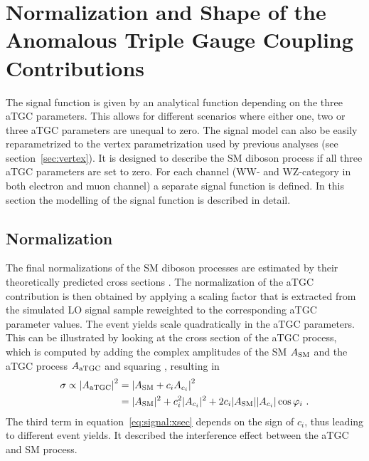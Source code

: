 \section{Normalization and Shape of the Anomalous Triple Gauge Coupling Contributions}
\label{sec:NormalizationandShapeoftheaTGCContributions}

The signal function is given by an analytical function depending on the three aTGC parameters. This allows for different scenarios where either one, two or three aTGC parameters are unequal to zero. The signal model can also be easily reparametrized to the vertex parametrization used by previous analyses (see section~\ref{sec:vertex}). It is designed to describe the SM diboson process if all three aTGC parameters are set to zero. For each channel (WW- and WZ-category in both electron and muon channel) a separate signal function is defined. In this section the modelling of the signal function is described in detail.

\subsection*{Normalization}
The final normalizations of the SM diboson processes are estimated by their theoretically predicted cross sections \cite{WWxsec,WZxsec}. The normalization of the aTGC contribution is then obtained by applying a scaling factor that is extracted from the simulated LO signal sample reweighted to the corresponding aTGC parameter values. The event yields scale quadratically in the aTGC parameters. This can be illustrated by looking at the cross section of the aTGC process, which is computed by adding the complex amplitudes of the SM $A_{\rm SM}$ and the aTGC process $A_{\rm aTGC}$ and squaring \cite{EFT}, resulting in
\begin{align}
\sigma \propto \left| A_{\rm aTGC}\right|^2 &= \left| A_{\rm SM} + c_i A_{c_i} \right|^2 \\
&= |A_{\rm SM}|^2 + c_i^2  |A_{c_i}|^2 + 2c_i  |A_{\rm SM}| |A_{c_i}|\cos \varphi_i ~. \label{eq:signal:xsec} 
\end{align}
The third term in equation~\ref{eq:signal:xsec} depends on the sign of $c_i$, thus leading to different event yields. It described the interference effect between the aTGC and SM process.


